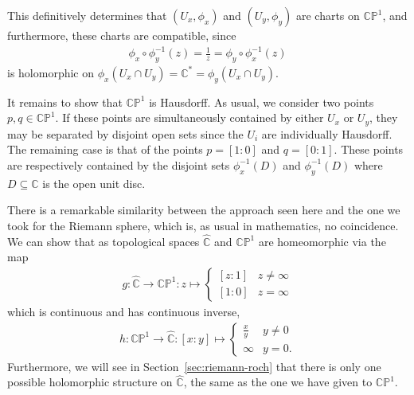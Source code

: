 This definitively determines that $ (U_x, \phi_x) $ and $ (U_y, \phi_y) $
are charts on $ \mathbb{C}\mathbb{P}^{1} $, and furthermore, these charts are
compatible, since
\begin{align*}
	\phi_x \circ \phi_y ^{-1}(z) = \frac{1}{z} = \phi_y \circ \phi_x ^{-1}(z)
\end{align*}
is holomorphic on $ \phi_x(U_x \cap U_y) = \mathbb{C}^{*} = \phi_y(U_x \cap U_y)
$.

It remains to show that $ \mathbb{C}\mathbb{P}^{1} $ is Hausdorff. As usual,
we consider two points $ p,q \in \mathbb{C}\mathbb{P}^{1} $. If these points are
simultaneously contained by either $ U_x $ or $ U_y $, they may be separated by
disjoint open sets since the $ U_i $ are individually Hausdorff. The remaining
case is that of the points $ p=[1:0] $ and $ q=[0:1] $. These points are
respectively contained by the disjoint sets $ \phi_x ^{-1}(D) $ and $ \phi_y
	^{-1}(D) $ where $ D \subseteq \mathbb{C} $ is the open unit
disc.

\begin{remark}
	There is a remarkable similarity between the approach seen here and the one we
	took for the Riemann sphere, which is, as usual in mathematics, no
	coincidence. We can show that as topological spaces $ \hat{\mathbb{C}} $ and $
		\mathbb{C}\mathbb{P}^{1} $ are homeomorphic via the map
	\begin{align*}
		g: \hat{\mathbb{C}} \to \mathbb{C}\mathbb{P}^{1}:z \mapsto \begin{cases}
			                                                           [z:1] & z \neq \infty \\
			                                                           [1:0] & z = \infty
		                                                           \end{cases}
	\end{align*}
	which is continuous and has continuous inverse,
	\begin{align*}
		h: \mathbb{C}\mathbb{P}^{1} \to \hat{\mathbb{C}}: [x:y] \mapsto \begin{cases}
			                                                                \frac{x}{y} & y \neq0 \\
			                                                                \infty
			                                                                            & y = 0.
		                                                                \end{cases}
	\end{align*}
	Furthermore, we will see in Section~\ref{sec:riemann-roch} that there is only
	one possible holomorphic structure on $ \hat{\mathbb{C}} $, the same as the
	one we have given to $ \mathbb{C}\mathbb{P}^{1} $.
\end{remark}

